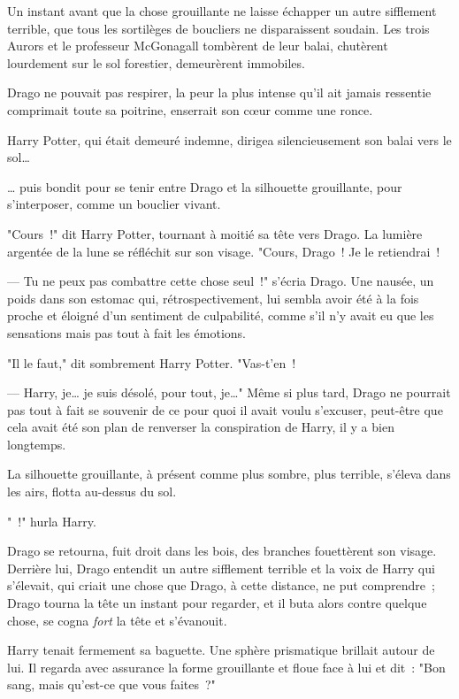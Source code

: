 \begin{em}
Un instant avant que la chose grouillante ne laisse échapper un autre sifflement terrible, que tous les sortilèges de boucliers ne disparaissent soudain. Les trois Aurors et le professeur McGonagall tombèrent de leur balai, chutèrent lourdement sur le sol forestier, demeurèrent immobiles.

Drago ne pouvait pas respirer, la peur la plus intense qu'il ait jamais ressentie comprimait toute sa poitrine, enserrait son cœur comme une ronce.

Harry Potter, qui était demeuré indemne, dirigea silencieusement son balai vers le sol…

… puis bondit pour se tenir entre Drago et la silhouette grouillante, pour s'interposer, comme un bouclier vivant.

"Cours~!" dit Harry Potter, tournant à moitié sa tête vers Drago. La lumière argentée de la lune se réfléchit sur son visage. "Cours, Drago~! Je le retiendrai~!

--- Tu ne peux pas combattre cette chose seul~!" s'écria Drago. Une nausée, un poids dans son estomac qui, rétrospectivement, lui sembla avoir été à la fois proche et éloigné d'un sentiment de culpabilité, comme s'il n'y avait eu que les sensations mais pas tout à fait les émotions.

"Il le faut," dit sombrement Harry Potter. "Vas-t'en~!

--- Harry, je… je suis désolé, pour tout, je…" Même si plus tard, Drago ne pourrait pas tout à fait se souvenir de ce pour quoi il avait voulu s'excuser, peut-être que cela avait été son plan de renverser la conspiration de Harry, il y a bien longtemps.

La silhouette grouillante, à présent comme plus sombre, plus terrible, s'éleva dans les airs, flotta au-dessus du sol.

"~!" hurla Harry.

Drago se retourna, fuit droit dans les bois, des branches fouettèrent son visage. Derrière lui, Drago entendit un autre sifflement terrible et la voix de Harry qui s'élevait, qui criait une chose que Drago, à cette distance, ne put comprendre~; Drago tourna la tête un instant pour regarder, et il buta alors contre quelque chose, se cogna \emph{fort} la tête et s'évanouit.
\end{em}

\later

Harry tenait fermement sa baguette. Une sphère prismatique brillait autour de lui. Il regarda avec assurance la forme grouillante et floue face à lui et dit~: "Bon sang, mais qu'est-ce que vous faites~?"

